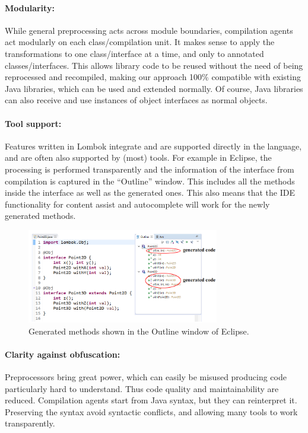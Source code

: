 \paragraph{Modularity:}
While general preprocessing acts across module boundaries, compilation
agents act modularly on each class/compilation unit. It makes sense to
apply the transformations to one class/interface at a time, and only to
annotated classes/interfaces. This allows library code to be reused
without the need of being reprocessed and recompiled, making our
approach 100\% compatible with existing Java libraries, which can be
used and extended normally. Of course, Java libraries can also receive
and use instances of object interfaces as normal objects.

\paragraph{Tool support:}
Features written in Lombok integrate and are supported directly in the
language, and are often also supported by (most) tools.  For example in Eclipse, the processing is
performed transparently and the information of the interface from
compilation is captured in the ``Outline'' window. This includes all
the methods inside the interface as well as the generated ones.  
This also means that the IDE functionality for content assist and
autocomplete will work for the newly generated methods.

\begin{figure}[h]\label{fig:screenshot}
\centering
\includegraphics[width=3.3in]{pdfs/screenshot2.png}
\caption{Generated methods shown in the Outline window of Eclipse.}
\end{figure}

\paragraph{Clarity against obfuscation:}
Preprocessors bring great power, which can easily be misused producing
code particularly hard to understand. Thus code quality and maintainability are reduced.
Compilation agents start from Java syntax, but they can reinterpret it.
Preserving the syntax avoid syntactic conflicts, and allowing many
tools to work transparently.

